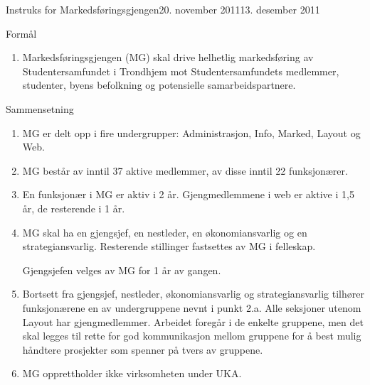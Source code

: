 \documentclass[../fsbok.tex]{subfiles}
\begin{document}
\begin{instruks}{Instruks for Markedsføringsgjengen}{20. november 2011}{13. desember 2011 }

    \begin{instruksledd}{Formål}
        \begin{enumerate}
            \item Markedsføringsgjengen (MG) skal drive helhetlig markedsføring av Studentersamfundet
                i Trondhjem mot
                Studentersamfundets medlemmer, studenter, byens befolkning og potensielle samarbeidspartnere.
        \end{enumerate}
    \end{instruksledd}

    \begin{instruksledd}{Sammensetning}
        \begin{enumerate}
            \item MG er delt opp i fire undergrupper: Administrasjon, Info, Marked, Layout og Web.
            \item MG består av inntil 37 aktive medlemmer, av disse inntil 22 funksjonærer.
            \item En funksjonær i MG er aktiv i 2 år. Gjengmedlemmene i web er aktive i 1,5 år, de
                resterende i 1 år.
            \item MG skal ha en gjengsjef, en nestleder, en økonomiansvarlig og en strategiansvarlig. Resterende stillinger fastsettes
                av MG i felleskap.

                Gjengsjefen velges av MG for 1 år av gangen.
            \item Bortsett fra gjengsjef, nestleder, økonomiansvarlig og strategiansvarlig tilhører funksjonærene en av undergruppene nevnt i punkt 2.a.
                Alle
                seksjoner utenom Layout har gjengmedlemmer. Arbeidet foregår i de enkelte gruppene, men det skal
                legges til
                rette for god kommunikasjon mellom gruppene for å best mulig håndtere prosjekter som spenner på
                tvers av
                gruppene.
            \item MG opprettholder ikke virksomheten under UKA.
        \end{enumerate}
    \end{instruksledd}


\end{instruks}
\end{document}
